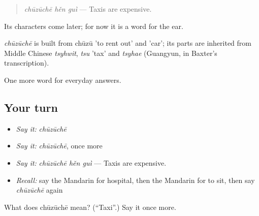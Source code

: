 \begin{quote}
\emph{chūzūchē hěn guì} — Taxis are expensive.
\end{quote}

Its characters come later; for now it is a word for the ear.

\begin{cousinweb}
\emph{chūzūchē} is built from chūzū 'to rent out' and  'car'; its parts are inherited from Middle Chinese \emph{tsyhwit}, \emph{tsu} 'tax' and \emph{tsyhae} (Guangyun, in Baxter's transcription).
\end{cousinweb}

\begin{grammarlens}[title={What you've built}]
One more word for everyday answers.
\end{grammarlens}

\subsection*{Your turn}
\begin{itemize}
\raggedright
  \item \emph{Say it:} \emph{chūzūchē}
  \item \emph{Say it:} \emph{chūzūchē}, once more
  \item \emph{Say it:} \emph{chūzūchē hěn guì} — Taxis are expensive.
  \item \emph{Recall:} say the Mandarin for hospital, then the Mandarin for to sit, then say \emph{chūzūchē} again
\end{itemize}

\begin{tcolorbox}[breakable,colback=teal!4,colframe=teal!35!black,title={Before you move on}]
What does chūzūchē mean? (\textquotedblleft{}Taxi\textquotedblright{}.) Say it once more.
\end{tcolorbox}
